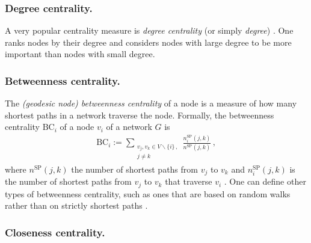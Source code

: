 \documentclass{comnet-mod}
\begin{document}
\subsubsection{Degree centrality.} 

A very popular centrality measure is \emph{degree centrality} (or simply \emph{degree}) \cite{Albert2000, Jeong2001, Dunne2002, Holme2002, Shargel2003, Dunne2004, Motter2004, Paul2004, Beygelzimer2005, Dartnell2005, Tanizawa2005, Estrada2006, Sole2008, Allesina2009, Herrmann2011, Nair2011, Schneider2011, Wu2011, Pu2012, Trajanovski2012, Hossain2013, Iyer2013, Sha2013, Trajanovski2013, Zhang2013, Zhang2013a, Lordan2014, Priester2014, Ventresca2014, Wang2014a, Zhou2014, Ahmadi2015, Gong2015, Nie2015, Pinnaka2015, Yang2015, Agreste2016, Dattilo2016, Hao2016, Khansari2016, Ren2016, Colladon2017, DeDomenico2017, Gao2017, Hong2017, Lance2017, Mourier2017, Sun2017, daCunha2017, Deng2019, Jiang2019, Nakayama2019, Zhou2019, Kazawa2020, Zhou2021, Tomassini2023, Borge-Holthoefer2012, Kaiser-Bunbury2010}. One ranks nodes by their degree and considers nodes with large degree to be more important than nodes with small degree.


\subsubsection{Betweenness centrality.} \label{sec:betweenness}

The \emph{(geodesic node) betweenness centrality} of a node is 
a measure of how many shortest paths in a network traverse the node. Formally, the betweenness centrality $\textrm{BC}_i$ of a node $v_i$ of a network $G$ is~\cite[p.\,152]{Estrada2015} 
\begin{align}
	\textrm{BC}_i := \sum_{\substack{v_j, v_k\in V\backslash\{i\}\,,\\j\neq k}}\frac{n^{\textrm{SP}}_{i}(j,k)}{n^{\textrm{SP}}(j,k)}\,,\nonumber
\end{align}
where $n^{\textrm{SP}}(j,k)$ the number of shortest paths from $v_j$ to $v_k$ and $n^{\textrm{SP}}_i(j,k)$ is the number of shortest paths from $v_j$ to $v_k$ that traverse $v_i$ \cite{Freeman1977}. One can define other types of betweenness centrality, such as ones that are based on random walks rather than on strictly shortest paths \cite{Newman2005}. 


\subsubsection{Closeness centrality.} 
\end{document}
